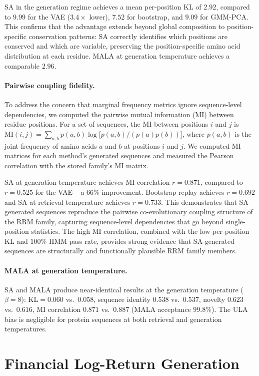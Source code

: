 SA in the generation regime achieves a mean per-position KL of $2.92$, compared to $9.99$ for the VAE ($3.4{\times}$ lower), $7.52$ for bootstrap, and $9.09$ for GMM-PCA. This confirms that the advantage extends beyond global composition to position-specific conservation patterns: SA correctly identifies which positions are conserved and which are variable, preserving the position-specific amino acid distribution at each residue. MALA at generation temperature achieves a comparable $2.96$.

\paragraph{Pairwise coupling fidelity.}
To address the concern that marginal frequency metrics ignore sequence-level dependencies, we computed the pairwise mutual information (MI) between residue positions. For a set of sequences, the MI between positions $i$ and $j$ is $\mathrm{MI}(i,j)=\sum_{a,b}p(a,b)\log\bigl[p(a,b)/(p(a)p(b))\bigr]$, where $p(a,b)$ is the joint frequency of amino acids $a$ and $b$ at positions $i$ and $j$. We computed MI matrices for each method's generated sequences and measured the Pearson correlation with the stored family's MI matrix.

SA at generation temperature achieves MI correlation $r{=}0.871$, compared to $r{=}0.525$ for the VAE -- a $66\%$ improvement. Bootstrap replay achieves $r{=}0.692$ and SA at retrieval temperature achieves $r{=}0.733$. This demonstrates that SA-generated sequences reproduce the pairwise co-evolutionary coupling structure of the RRM family, capturing sequence-level dependencies that go beyond single-position statistics. The high MI correlation, combined with the low per-position KL and $100\%$ HMM pass rate, provides strong evidence that SA-generated sequences are structurally and functionally plausible RRM family members.

\paragraph{MALA at generation temperature.}
SA and MALA produce near-identical results at the generation temperature ($\beta{=}8$): KL$=0.060$ vs.\ $0.058$, sequence identity $0.538$ vs.\ $0.537$, novelty $0.623$ vs.\ $0.616$, MI correlation $0.871$ vs.\ $0.887$ (MALA acceptance $99.8\%$). The ULA bias is negligible for protein sequences at both retrieval and generation temperatures.

\section{Financial Log-Return Generation}\label{app:finance}

